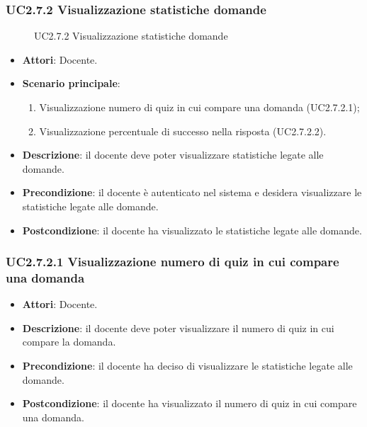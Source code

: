 \subsubsection{UC2.7.2 Visualizzazione statistiche domande}
\begin{figure}[H]
\centering
\noindent{}
\caption{UC2.7.2 Visualizzazione statistiche domande}
\end{figure}
\begin{itemize}
\item \textbf{Attori}: Docente.
\item \textbf{Scenario principale}:
\begin{enumerate}
\item Visualizzazione numero di quiz in cui compare una domanda (UC2.7.2.1);
\item Visualizzazione percentuale di successo nella risposta (UC2.7.2.2).
\end{enumerate}
\item \textbf{Descrizione}: il docente deve poter visualizzare statistiche legate alle domande.
\item \textbf{Precondizione}: il docente è autenticato nel sistema e desidera visualizzare le statistiche legate alle domande.
\item \textbf{Postcondizione}: il docente ha visualizzato le statistiche legate alle domande.
\end{itemize}
\subsubsection{UC2.7.2.1 Visualizzazione numero di quiz in cui compare una domanda}
\begin{itemize}
\item \textbf{Attori}: Docente.
\item \textbf{Descrizione}: il docente deve poter visualizzare il numero di quiz in cui compare la domanda.
\item \textbf{Precondizione}: il docente ha deciso di visualizzare le statistiche legate alle domande.
\item \textbf{Postcondizione}: il docente ha visualizzato il numero di quiz in cui compare una domanda.
\end{itemize}
